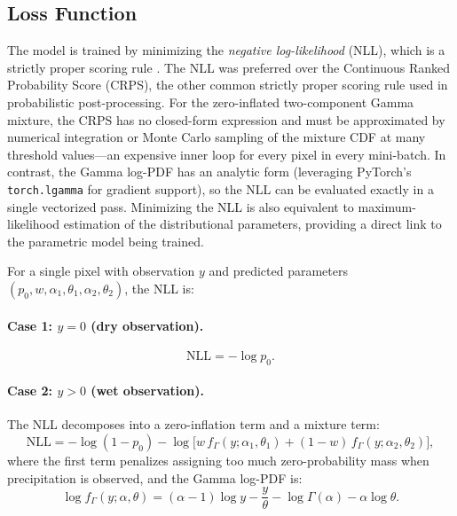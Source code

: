 \documentclass[11pt]{article}
\begin{document}
\subsection{Loss Function}
\label{sec:loss}

The model is trained by minimizing the \emph{negative
log-likelihood} (NLL), which is a strictly proper scoring rule
\citep{gneiting2007}.  The NLL was preferred over the Continuous Ranked Probability Score
(CRPS), the other common strictly proper scoring rule used in probabilistic
post-processing.  For the zero-inflated two-component Gamma mixture,
the CRPS has no closed-form expression and must be approximated by
numerical integration or Monte Carlo sampling of the mixture CDF at
many threshold values---an expensive inner loop for every pixel in
every mini-batch.  In contrast, the Gamma log-PDF has an analytic
form (leveraging PyTorch's \texttt{torch.lgamma} for gradient support), so
the NLL can be evaluated exactly in a single vectorized pass.
Minimizing the NLL is also equivalent to maximum-likelihood
estimation of the distributional parameters, providing a direct
link to the parametric model being trained.

For a single pixel with observation $y$ and predicted parameters $(p_0, w, \alpha_1, \theta_1, \alpha_2, \theta_2)$, the NLL is:

\paragraph{Case 1: $y = 0$ (dry observation).}
\begin{equation}
  \text{NLL} = -\log p_0.
  \label{eq:nll_zero}
\end{equation}

\paragraph{Case 2: $y > 0$ (wet observation).}
The NLL decomposes into a zero-inflation term and a mixture term:
\begin{equation}
  \text{NLL} = -\log(1 - p_0)
    - \log\!\big[
        w \, f_{\Gamma}(y; \alpha_1, \theta_1)
        + (1-w) \, f_{\Gamma}(y; \alpha_2, \theta_2)
      \big],
  \label{eq:nll_positive}
\end{equation}
where the first term penalizes assigning too much zero-probability
mass when precipitation is observed, and the Gamma log-PDF is:
\begin{equation}
  \log f_{\Gamma}(y; \alpha, \theta)
    = (\alpha - 1) \log y - \frac{y}{\theta}
      - \log \Gamma(\alpha) - \alpha \log \theta.
  \label{eq:gamma_logpdf}
\end{equation}
\end{document}
